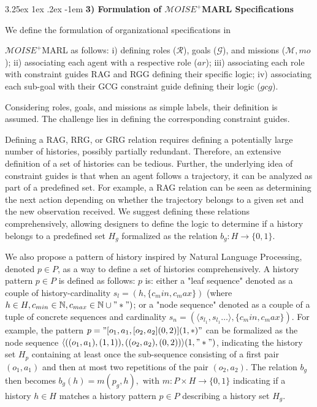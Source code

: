 \documentclass[conference]{IEEEtran}
\makeatletter
\renewcommand\paragraph{\@startsection{paragraph}{5}{\z@}%
  {3.25ex \@plus1ex \@minus.2ex}%
  {-1em}%
  {\normalfont\normalsize\bfseries}}
\makeatother
\begin{document}
\paragraph{\textbf{3) Formulation of $\mathcal{M}OISE^+$MARL Specifications}} \quad

\noindent We define the formulation of organizational specifications in

\noindent $\mathcal{M}OISE^+$MARL as follows: \quad i) defining roles ($\mathcal{R}$), goals ($\mathcal{G}$), and missions ($\mathcal{M}, mo$); ii) associating each agent with a respective role ($ar$); \quad iii) associating each role with constraint guides RAG and RGG defining their specific logic; iv) associating each sub-goal with their GCG constraint guide defining their logic ($gcg$).

Considering roles, goals, and missions as simple labels, their definition is assumed. The challenge lies in defining the corresponding constraint guides.

Defining a RAG, RRG, or GRG relation requires defining a potentially large number of histories, possibly partially redundant. Therefore, an extensive definition of a set of histories can be tedious. Further, the underlying idea of constraint guides is that when an agent follows a trajectory, it can be analyzed as part of a predefined set. For example, a RAG relation can be seen as determining the next action depending on whether the trajectory belongs to a given set and the new observation received. We suggest defining these relations comprehensively, allowing designers to define the logic to determine if a history belongs to a predefined set $H_g$ formalized as the relation $b_g: H \to \{0,1\}$.

We also propose a pattern of history inspired by Natural Language Processing, denoted $p \in P$, as a way to define a set of histories comprehensively. A history pattern $p \in P$ is defined as follows: $p$ is: either a "leaf sequence" denoted as a couple of history-cardinality $s_l = (h, \{c_min,c_max\})$ (where $h \in H, c_{min} \in \mathbb{N}, c_{max} \in \mathbb{N} \cup "*")$; or a "node sequence" denoted as a couple of a tuple of concrete sequences and cardinality $s_n = (\langle s_{l_1}, s_{l_1}\dots \rangle, \{c_min,c_max\})$. For example, the pattern $p = \allowbreak "[o_1,a_1,[o_2,a_2](0,2)](1,*)"$ can be formalized as the node sequence $\allowbreak \langle ((o_1,a_1),(1,1)), ((o_2,a_2),(0,2))\rangle(1,"*")$, indicating the history set $H_p$ containing at least once the sub-sequence consisting of a first pair $(o_1,a_1)$ and then at most two repetitions of the pair $(o_2,a_2)$.
The relation $b_g$ then becomes $b_g(h) = m(p_g,h), \text{ with } m: P \times H \to \{0,1\}$ indicating if a history $h \in H$ matches a history pattern $p \in P$ describing a history set $H_g$.
\end{document}
